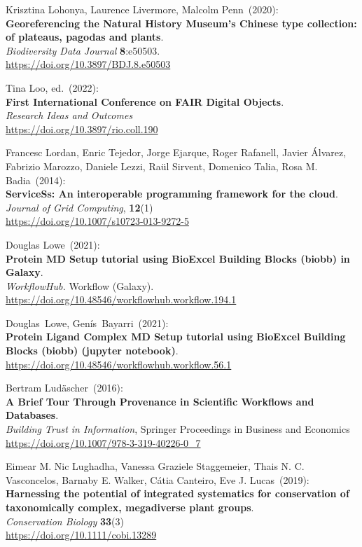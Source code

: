 \begin{thebibliography}{9}
Krisztina Lohonya, Laurence Livermore, Malcolm Penn~(2020): \\
\textbf{Georeferencing the Natural History Museum's Chinese type collection: of plateaus, pagodas and plants}.\\
\emph{Biodiversity Data Journal} \textbf{8}:e50503.\\
\url{https://doi.org/10.3897/BDJ.8.e50503}

Tina Loo, ed.~(2022): \\
\textbf{First International Conference on FAIR Digital Objects}.\\
\emph{Research Ideas and Outcomes}\\
\url{https://doi.org/10.3897/rio.coll.190}

Francesc Lordan, Enric Tejedor, Jorge Ejarque, Roger Rafanell, Javier Álvarez, Fabrizio Marozzo, Daniele Lezzi, Raül Sirvent, Domenico Talia, Rosa M. Badia~(2014): \\
\textbf{ServiceSs: An interoperable programming framework for the cloud}.\\
\emph{Journal of Grid Computing}, \textbf{12}(1)\\
\url{https://doi.org/10.1007/s10723-013-9272-5}

Douglas Lowe~(2021): \\
\textbf{Protein MD Setup tutorial using BioExcel Building Blocks (biobb) in Galaxy}.\\
\emph{WorkflowHub.} Workflow (Galaxy).\\
\url{https://doi.org/10.48546/workflowhub.workflow.194.1}

Douglas~Lowe, Genís~Bayarri~(2021): \\
\textbf{Protein Ligand Complex MD Setup tutorial using BioExcel Building Blocks (biobb) (jupyter notebook)}.\\
\url{https://doi.org/10.48546/workflowhub.workflow.56.1}

Bertram Ludäscher~(2016): \\
\textbf{A Brief Tour Through Provenance in Scientific Workflows and Databases}.\\
\emph{Building Trust in Information}, Springer Proceedings in Business and Economics \\
\url{https://doi.org/10.1007/978-3-319-40226-0_7}

Eimear M. Nic Lughadha, Vanessa Graziele Staggemeier, Thais N. C. Vasconcelos, Barnaby E. Walker, Cátia Canteiro, Eve J. Lucas~(2019): \\
\textbf{Harnessing the potential of integrated systematics for conservation of taxonomically complex, megadiverse plant groups}.\\ 
\emph{Conservation Biology} \textbf{33}(3)\\
\url{https://doi.org/10.1111/cobi.13289}


\end{thebibliography}
